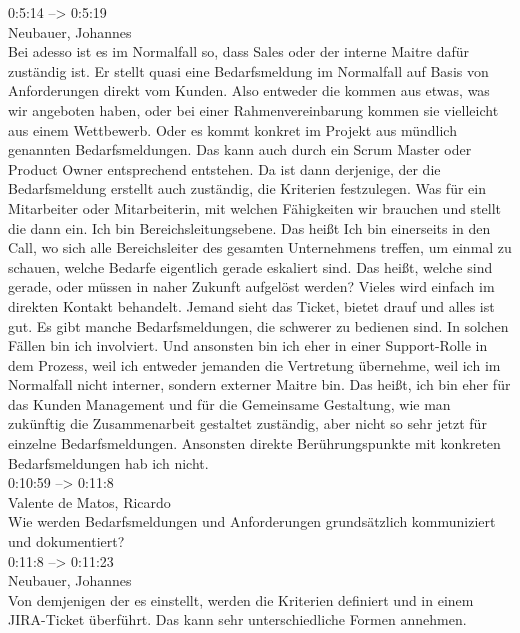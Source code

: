 0:5:14 --> 0:5:19\\
Neubauer, Johannes\\
Bei adesso ist es im Normalfall so, dass Sales oder der interne Maitre dafür zuständig ist. Er stellt quasi eine Bedarfsmeldung im Normalfall auf Basis von Anforderungen direkt vom Kunden. Also entweder die kommen aus etwas, was wir angeboten haben, oder bei einer Rahmenvereinbarung kommen sie vielleicht aus einem Wettbewerb. Oder es kommt konkret im Projekt aus mündlich genannten Bedarfsmeldungen. Das kann auch durch ein Scrum Master oder Product Owner entsprechend entstehen. Da ist dann derjenige, der die Bedarfsmeldung erstellt auch zuständig, die Kriterien festzulegen. Was für ein Mitarbeiter oder Mitarbeiterin, mit welchen Fähigkeiten wir brauchen und stellt die dann ein. Ich bin Bereichsleitungsebene. Das heißt Ich bin einerseits in den Call, wo sich alle Bereichsleiter des gesamten Unternehmens treffen, um einmal zu schauen, welche Bedarfe eigentlich gerade eskaliert sind. Das heißt, welche sind gerade, oder müssen in naher Zukunft aufgelöst werden? Vieles wird einfach im direkten Kontakt behandelt. Jemand sieht das Ticket, bietet drauf und alles ist gut. Es gibt manche Bedarfsmeldungen, die schwerer zu bedienen sind. In solchen Fällen bin ich involviert. Und ansonsten bin ich eher in einer Support-Rolle in dem Prozess, weil ich entweder jemanden die Vertretung übernehme, weil ich im Normalfall nicht interner, sondern externer Maitre bin. Das heißt, ich bin eher für das Kunden Management und für die Gemeinsame Gestaltung, wie man zukünftig die Zusammenarbeit gestaltet zuständig, aber nicht so sehr jetzt für einzelne Bedarfsmeldungen. Ansonsten direkte Berührungspunkte mit konkreten Bedarfsmeldungen hab ich nicht.\\

0:10:59 --> 0:11:8\\
Valente de Matos, Ricardo\\
Wie werden Bedarfsmeldungen und Anforderungen grundsätzlich kommuniziert und dokumentiert?\\

0:11:8 --> 0:11:23\\
Neubauer, Johannes\\
Von demjenigen der es einstellt, werden die Kriterien definiert und in einem JIRA-Ticket überführt. Das kann sehr unterschiedliche Formen annehmen.\\

